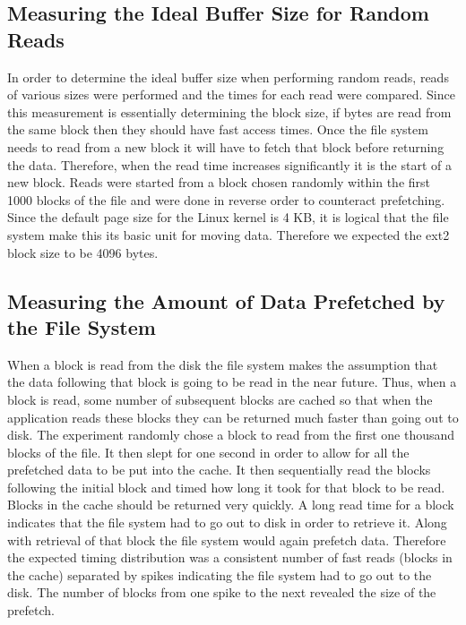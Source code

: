 \documentclass[letterpaper,twocolumn,10pt]{article}
\begin{document}
\subsection{Measuring the Ideal Buffer Size for Random Reads}

In order to determine the ideal buffer size when performing random reads, reads of various sizes were performed and the times for each read were compared. 
Since this measurement is essentially determining the block size, if bytes are read from the same block then they should have fast access times. 
Once the file system needs to read from a new block it will have to fetch that block before returning the data. 
Therefore, when the read time increases significantly it is the start of a new block.
Reads were started from a block chosen randomly within the first 1000 blocks of the file and were done in reverse order to counteract prefetching. 
Since the default page size for the Linux kernel is 4 KB, it is logical that the file system make this its basic unit for moving data. 
Therefore we expected the ext2 block size to be 4096 bytes.

\subsection{Measuring the Amount of Data Prefetched by the File System}
When a block is read from the disk the file system makes the assumption that the data following that block is going to be read in the near future. 
Thus, when a block is read, some number of subsequent blocks are cached so that when the application reads these blocks they can be returned much faster than going out to disk. 
The experiment randomly chose a block to read from the first one thousand blocks of the file. 
It then slept for one second in order to allow for all the prefetched data to be put into the cache. 
It then sequentially read the blocks following the initial block and timed how long it took for that block to be read. 
Blocks in the cache should be returned very quickly. 
A long read time for a block indicates that the file system had to go out to disk in order to retrieve it. 
Along with retrieval of that block the file system would again prefetch data. 
Therefore the expected timing distribution was a consistent number of fast reads (blocks in the cache) separated by spikes indicating the file system had to go out to the disk. 
The number of blocks from one spike to the next revealed the size of the prefetch.
\end{document}

